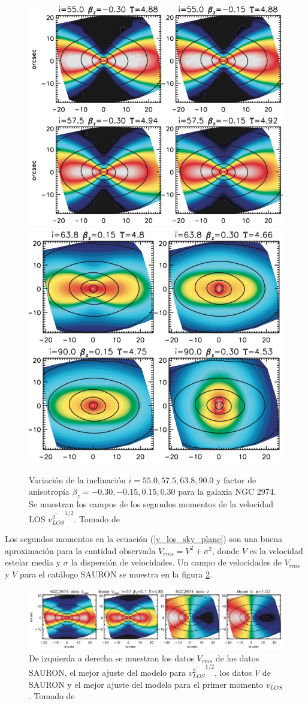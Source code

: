 \begin{figure}
  \centering
    \includegraphics[width=0.45\columnwidth]{Kap2/NGC2974_1.png}
    \includegraphics[width=0.45\columnwidth]{Kap2/NGC2974_2.png}
  \caption{Variación de la inclinación $i = 55.0, 57.5, 63.8, 90.0$ y factor de anisotropía $\beta_z = -0.30, -0.15, 0.15, 0.30$ para la galaxia NGC 2974. Se muestran los campos de los segundos momentos de la velocidad LOS $\overline{v_{LOS}^2}^{1/2}$. Tomado de \cite{2008MNRAS.390_71C}}
  \label{fig:NGC2974}
\end{figure}

Los segundos momentos en la ecuación (\ref{v_los_sky_plane}) son una buena aproximación para la cantidad observada $V_{rms} = V^2 + \sigma^2$, donde $V$ es la velocidad estelar media y $\sigma$ la dispersión de velocidades. Un campo de velocidades de $V_{rms}$ y $V$ para el catálogo SAURON se muestra en la figura   \ref{fig:NGC2974_2}.

\begin{figure}
  \centering
    \includegraphics[width=0.95\columnwidth]{Kap2/NGC2974_3.png}
  \caption{De izquierda a derecha se muestran los datos $V_{rms}$ de los datos SAURON, el mejor ajuste del modelo para $\overline{v_{LOS}^2}^{1/2}$, los datos $V$ de SAURON y el mejor ajuste del modelo para el primer momento $\overline{v_{LOS}}$. Tomado de \cite{2008MNRAS.390_71C}}
  \label{fig:NGC2974_2}
\end{figure}


